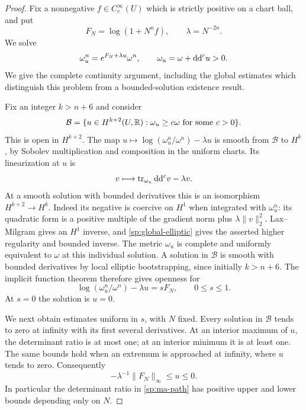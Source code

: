 \begin{proof}
Fix a nonnegative $f\in C_c^\infty(U)$ which is strictly positive on a
chart ball, and put
\[
 F_N=\log(1+N^nf),\qquad \lambda=N^{-2n}.
\]
We solve
\begin{equation}\label{sp:ma-equation}
 \omega_u^n=e^{F_N+\lambda u}\omega^n,
 \qquad \omega_u=\omega+\mathrm d\mathrm d^c u>0.
\end{equation}
We give the complete continuity argument, including the global estimates
which distinguish this problem from a bounded-solution existence result.

Fix an integer $k>n+6$ and consider
\[
 \mathcal B=\{u\in H^{k+2}(U,\mathbb R):
                 \omega_u\ge c\omega\text{ for some }c>0\}.
\]
This is open in $H^{k+2}$.  The map
$u\mapsto\log(\omega_u^n/\omega^n)-\lambda u$ is smooth from
$\mathcal B$ to $H^k$, by Sobolev multiplication and composition in the
uniform charts.  Its linearization at $u$ is
\begin{equation}\label{sp:ma-linearization}
 v\longmapsto\operatorname{tr}_{\omega_u}\mathrm d\mathrm d^c v-\lambda v.
\end{equation}
At a smooth solution with bounded derivatives this is an isomorphism
$H^{k+2}\to H^k$.  Indeed its negative is coercive on $H^1$ when
integrated with $\omega_u^n$: its quadratic form is a positive multiple
of the gradient norm plus $\lambda\|v\|_2^2$.  Lax--Milgram gives an
$H^1$ inverse, and \eqref{sp:global-elliptic} gives the asserted higher
regularity and bounded inverse.  The metric $\omega_u$ is complete and
uniformly equivalent to $\omega$ at this individual solution.  A solution
in $\mathcal B$ is smooth with bounded derivatives by local elliptic
bootstrapping, since initially $k>n+6$.  The implicit function theorem
therefore gives openness for
\begin{equation}\label{sp:ma-path}
 \log(\omega_u^n/\omega^n)-\lambda u=sF_N,
 \qquad 0\le s\le1.
\end{equation}
At $s=0$ the solution is $u=0$.

We next obtain estimates uniform in $s$, with $N$ fixed.  Every solution
in $\mathcal B$ tends to zero at infinity with its first several
derivatives.  At an interior maximum of $u$, the determinant ratio is at
most one; at an interior minimum it is at least one.  The same bounds
hold when an extremum is approached at infinity, where $u$ tends to zero.
Consequently
\begin{equation}\label{sp:ma-czero}
 -\lambda^{-1}\|F_N\|_\infty\le u\le0.
\end{equation}
In particular the determinant ratio in \eqref{sp:ma-path} has positive
upper and lower bounds depending only on $N$.


\end{proof}
